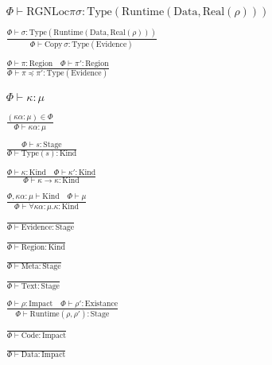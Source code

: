 \documentclass {article}
\begin{document}
\begin{gather*}
{\Phi \vdash \text{RGNLoc} \pi \sigma : \text{Type}(\text{Runtime} (\text{Data}, \text{Real}(\rho)))} \\
\\
\frac
{\Phi \vdash \sigma : \text{Type}(\text{Runtime}(\text{Data}, \text{Real}(\rho)))}
{\Phi \vdash \text{Copy} \, \sigma : \text{Type}(\text{Evidence})} \\
\\
\frac
{\Phi \vdash \pi : \text{Region} \quad \Phi \vdash \pi' : \text{Region}}
{\Phi \vdash \pi \preceq \pi' : \text{Type}(\text{Evidence})}
\\
\\
\\
\Phi \vdash \kappa : \mu \tag*{[Kind Validation]} \\
\\
\frac
{(\kappa \alpha : \mu) \in \Phi}
{\Phi \vdash \kappa \alpha : \mu } \\
\\
\frac
{\Phi \vdash s : \text{Stage}}
{\Phi \vdash \text {Type} (s) : \text{Kind}} \\
\\
\frac
{\Phi \vdash \kappa : \text{Kind} \quad \Phi \vdash \kappa' : \text{Kind}}
{\Phi \vdash \kappa \to \kappa : \text{Kind} } \\
\\
\frac
{\Phi, \kappa \alpha : \mu \vdash \text{Kind} \quad \Phi \vdash \mu }
{\Phi \vdash \forall \kappa \alpha : \mu. \kappa : \text{Kind}  } \\
\\
\frac
{}
{\Phi \vdash \text{Evidence} : \text{Stage}} \\
\\
\frac
{}
{\Phi \vdash \text{Region} : \text{Kind}} \\
\\
\frac
{}
{\Phi \vdash \text{Meta} : \text{Stage}} \\
\\
\frac
{}
{\Phi \vdash \text{Text} : \text{Stage}} \\
\\
\frac
{\Phi \vdash \rho : \text{Impact} \quad \Phi \vdash \rho' : \text{Existance}}
{\Phi \vdash \text{Runtime} (\rho, \rho') : \text{Stage}} \\
\\
\frac
{}
{\Phi \vdash \text{Code} : \text{Impact}} \\
\\
\frac
{}
{\Phi \vdash \text{Data} : \text{Impact}} \\

\end{gather*}
\end{document}
